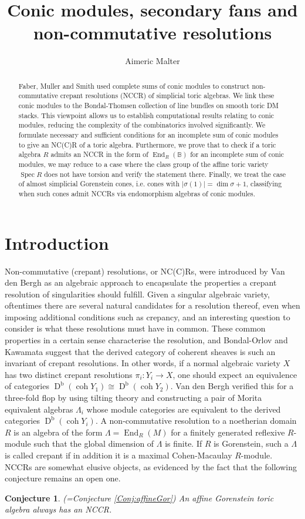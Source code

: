 \documentclass[reqno, 12pt]{amsart}
\title[Conic modules, secondary fans and NCRs]{Conic modules, secondary fans and non-commutative resolutions}
\author{Aimeric Malter}
\newtheorem{conjecture}[theorem]{Conjecture}
\theoremstyle{definition}
\numberwithin{equation}{section}
\newcommand{\dbcoh}[1]{\operatorname{D}^{\operatorname{b}}(\operatorname{coh }#1)}
\newcommand{\End}{\operatorname{End}}
\newcommand{\spec}{\operatorname{Spec}}
\begin{document}

\begin{abstract}
Faber, Muller and Smith used complete sums of conic modules to construct non-commutative crepant resolutions (NCCR) of simplicial toric algebras. We link these conic modules to the Bondal-Thomsen collection of line bundles on smooth toric DM stacks. This viewpoint allows us to establish computational results relating to conic modules, reducing the complexity of the combinatorics involved significantly. We formulate necessary and sufficient conditions for an incomplete sum of conic modules to give an NC(C)R of a toric algebra. Furthermore, we prove that to check if a toric algebra $R$ admits an NCCR in the form of $\End_R(\mathbb{B})$ for an incomplete sum of conic modules, we may reduce to a case where the class group of the affine toric variety $\spec R$ does not have torsion and verify the statement there. Finally, we treat the case of almost simplicial Gorenstein cones, i.e. cones with $|\sigma(1)|=\dim \sigma+1$, classifying when such cones admit NCCRs via endomorphism algebras of conic modules.
\end{abstract}
\maketitle
\tableofcontents

\section{Introduction}

Non-commutative (crepant) resolutions, or NC(C)Rs, were introduced by Van den Bergh as an algebraic approach to encapsulate the properties a crepant resolution of singularities should fulfill. Given a singular algebraic variety, oftentimes there are several natural candidates for a resolution thereof, even when imposing additional conditions such as crepancy, and an interesting question to consider is what these resolutions must have in common. These common properties in a certain sense characterise the resolution, and Bondal-Orlov \cite{BO02} and Kawamata \cite{Kaw02} suggest that the derived category of coherent sheaves is such an invariant of crepant resolutions. In other words, if a normal algebraic variety $X$ has two distinct crepant resolutions $\pi_i:Y_i\rightarrow X$, one should expect an equivalence of categories $\dbcoh{Y_1}\cong \dbcoh{Y_2}$. Van den Bergh \cite{VdB3Dflops} verified this for a three-fold flop by using tilting theory and constructing a pair of Morita equivalent algebras $\Lambda_i$ whose module categories are equivalent to the derived categories $\dbcoh{Y_i}$. A non-commutative resolution to a noetherian domain $R$ is an algebra of the form $\Lambda=\End_R(M)$ for a finitely generated reflexive $R$-module such that the global dimension of $\Lambda$ is finite. If $R$ is Gorenstein, such a $\Lambda$ is called crepant if in addition it is a maximal Cohen-Macaulay $R$-module. NCCRs are somewhat elusive objects, as evidenced by the fact that the following conjecture remains an open one.
\begin{conjecture}(=Conjecture \ref{Conj:affineGor})
    An affine Gorenstein toric algebra always has an NCCR.
\end{conjecture}
\end{document}
